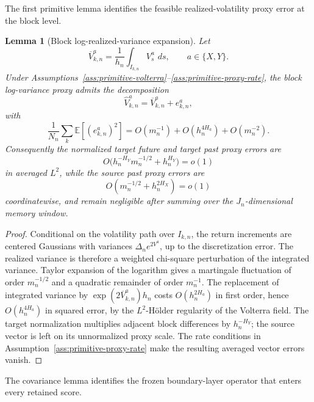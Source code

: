 \documentclass[11pt,a4paper]{amsart}
\theoremstyle{plain}
\newtheorem{lemma}[theorem]{Lemma}
\theoremstyle{definition}
\theoremstyle{remark}
\newcommand{\EE}{\mathbb{E}}
\newcommand{\dd}{\,d}
\begin{document}
The first primitive lemma identifies the feasible realized-volatility proxy error at the block
level.

\begin{lemma}[Block log-realized-variance expansion]\label{lem:block-rv-expansion}
Let
\[
        \overline V_{k,n}^{a}
        =
        \frac1{h_n}\int_{I_{k,n}}V_s^a\,\dd s,
        \qquad
        a\in\{X,Y\}.
\]
Under Assumptions~\ref{ass:primitive-volterra}--\ref{ass:primitive-proxy-rate}, the block
log-variance proxy admits the decomposition
\[
        \widehat V_{k,n}^{a}
        =
        \overline V_{k,n}^{a}
        +
        e_{k,n}^{a},
\]
with
\[
        \frac1{N_n}\sum_k\EE[(e_{k,n}^{a})^2]
        =
        O(m_n^{-1})+O(h_n^{4H_a})+O(m_n^{-2}).
\]
Consequently the normalized target future and target past proxy errors are
\[
        O\bigl(h_n^{-H_Y}m_n^{-1/2}+h_n^{H_Y}\bigr)
        =
        o(1)
\]
in averaged \(L^2\), while the source past proxy errors are
\[
        O(m_n^{-1/2}+h_n^{2H_X})=o(1)
\]
coordinatewise, and remain negligible after summing over the \(J_n\)-dimensional memory window.
\end{lemma}

\begin{proof}
Conditional on the volatility path over \(I_{k,n}\), the return increments are centered Gaussians
with variances \(\Delta_n e^{2V^a}\), up to the discretization error.  The realized
variance is therefore a weighted chi-square perturbation of the integrated variance.  Taylor
expansion of the logarithm gives a martingale fluctuation of order \(m_n^{-1/2}\) and a quadratic
remainder of order \(m_n^{-1}\).  The replacement of integrated variance by
\(\exp(2\overline V_{k,n}^a)h_n\) costs \(O(h_n^{2H_a})\) in first order, hence
\(O(h_n^{4H_a})\) in squared error, by the \(L^2\)-H\"older regularity of the Volterra field.  The
target normalization multiplies adjacent block differences by \(h_n^{-H_Y}\); the source vector is
left on its unnormalized proxy scale.  The rate conditions in
Assumption~\ref{ass:primitive-proxy-rate} make the resulting averaged vector errors vanish.
\end{proof}

The covariance lemma identifies the frozen boundary-layer operator that enters every retained score.
\end{document}
